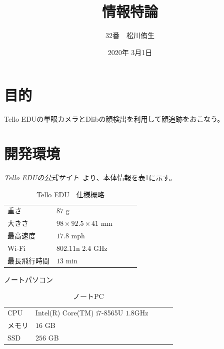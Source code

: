 \documentclass[uplatex]{jsarticle}
\title{情報特論}
\author{32番　松川侑生}
\date{2020年 3月1日}
\begin{document}
\maketitle
\section{目的}
    Tello EDUの単眼カメラとDlibの顔検出を利用して顔追跡をおこなう。
\section{開発環境}
    \textit{Tello EDUの公式サイト}~\cite{tello}より、本体情報を表\ref{tab:tello}に示す。
\begin{table}[htbp]
  \centering
  \caption{Tello EDU　仕様概略}
  \begin{tabular}{lllll}  \hline
  重さ     & $87  $ g            \\ 
  大きさ    & $98 \times 92.5 \times 41 $ mm   \\ 
  最高速度   & $ 17.8$ mph   \\ 
  Wi-Fi  & 802.11n 2.4 GHz \\
  最長飛行時間 & $13$ min  \\ \hline
  \end{tabular}
  \label{tab:tello}
\end{table}

    ノートパソコン\\
\begin{table}[htbp]
  \centering
  \caption{ノートPC}
  \begin{tabular}{lllll}  \hline
  CPU     & Intel(R) Core(TM) i7-8565U $1.8$GHz    \\ 
  メモリ & $16$ GB   \\ 
  SSD & $256$ GB \\ \hline
  \end{tabular} 
  \label{tab:laptop}
\end{table}
\end{document}
